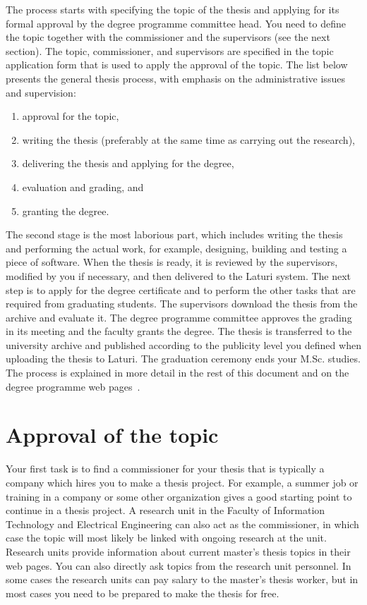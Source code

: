 The process starts with specifying the topic of the thesis and applying for its formal approval by the degree programme committee head. You need to define the topic together with the commissioner and the supervisors (see the next section). The topic, commissioner, and supervisors are specified in the topic application form that is used to apply the approval of the topic. The list below presents the general thesis process, with emphasis on the administrative issues and supervision:

\begin{enumerate}
    \setlength\itemsep{0pt}
    \setlength\parskip{0pt}
    \item approval for the topic,
    \item writing the thesis (preferably at the same time as carrying out the research),
    \item delivering the thesis and applying for the degree,
    \item evaluation and grading, and
    \item granting the degree.
\end{enumerate}

The second stage is the most laborious part, which includes writing the thesis and performing the actual work, for example, designing, building and testing a piece of software. When the thesis is ready, it is reviewed by the supervisors, modified by you if necessary, and then delivered to the Laturi system. The next step is to apply for the degree certificate and to perform the other tasks that are required from graduating students. The supervisors download the thesis from the archive and evaluate it. The degree programme committee approves the grading in its meeting and the faculty grants the degree. The thesis is transferred to the university archive and published according to the publicity level you defined when uploading the thesis to Laturi. The graduation ceremony ends your M.Sc. studies. The process is explained in more detail in the rest of this document and on the degree programme web pages~\cite{mscstudies}.

\section{Approval of the topic}

Your first task is to find a commissioner for your thesis that is typically a company which hires you to make a thesis project. For example, a summer job or training in a company or some other organization gives a good starting point to continue in a thesis project. A research unit in the Faculty of Information Technology and Electrical Engineering can also act as the commissioner, in which case the topic will most likely be linked with ongoing research at the unit. Research units provide information about current master’s thesis topics in their web pages. You can also directly ask topics from the research unit personnel. In some cases the research units can pay salary to the master’s thesis worker, but in most cases you need to be prepared to make the thesis for free.

